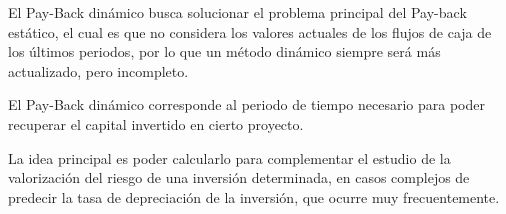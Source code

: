 El Pay-Back dinámico busca solucionar el problema principal del Pay-back estático,
el cual es que no considera los valores actuales de los flujos de caja de los últimos
periodos, por lo que un método dinámico siempre será más actualizado, pero incompleto.

El Pay-Back dinámico corresponde al periodo de tiempo necesario para poder recuperar
el capital invertido en cierto proyecto.

La idea principal es poder calcularlo para complementar el estudio de la valorización
del riesgo de una inversión determinada, en casos complejos de predecir la tasa de
depreciación de la inversión, que ocurre muy frecuentemente.



%
%
%
%
%
%
%
